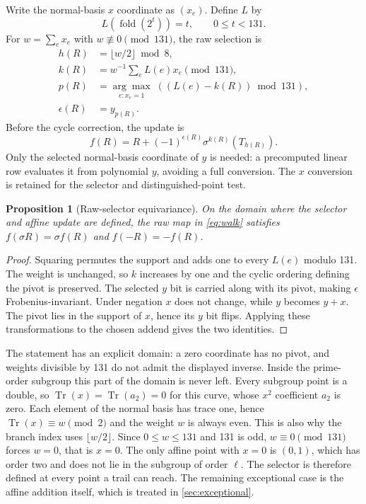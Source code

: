 \documentclass[11pt,a4paper]{article}
\newtheorem{proposition}{Proposition}
\begin{document}
Write the normal-basis $x$ coordinate as $(x_e)$. Define $L$ by
\begin{equation}
 L(\operatorname{fold}(2^t))=t,\qquad 0\leq t<131.
\end{equation}
For $w=\sum_e x_e$ with $w\not\equiv0\pmod{131}$, the raw selection is
\begin{align}
 h(R)&=\lfloor w/2\rfloor\bmod8,\\
 k(R)&=w^{-1}\sum_e L(e)x_e\pmod{131},\\
 p(R)&=\underset{e:x_e=1}{\arg\max}\;((L(e)-k(R))\bmod131),\\
 \epsilon(R)&=y_{p(R)}.
\end{align}
Before the cycle correction, the update is
\begin{equation}\label{eq:walk}
 f(R)=R+(-1)^{\epsilon(R)}\sigma^{k(R)}(T_{h(R)}).
\end{equation}
Only the selected normal-basis coordinate of $y$ is needed: a precomputed linear row evaluates it from polynomial $y$, avoiding a full conversion. The $x$ conversion is retained for the selector and distinguished-point test.

\begin{proposition}[Raw-selector equivariance]
On the domain where the selector and affine update are defined, the raw map in \cref{eq:walk} satisfies $f(\sigma R)=\sigma f(R)$ and $f(-R)=-f(R)$.
\end{proposition}
\begin{proof}
Squaring permutes the support and adds one to every $L(e)$ modulo 131. The weight is unchanged, so $k$ increases by one and the cyclic ordering defining the pivot is preserved. The selected $y$ bit is carried along with its pivot, making $\epsilon$ Frobenius-invariant. Under negation $x$ does not change, while $y$ becomes $y+x$. The pivot lies in the support of $x$, hence its $y$ bit flips. Applying these transformations to the chosen addend gives the two identities.
\end{proof}

The statement has an explicit domain: a zero coordinate has no pivot, and weights divisible by 131 do not admit the displayed inverse. Inside the prime-order subgroup this part of the domain is never left. Every subgroup point is a double, so $\operatorname{Tr}(x)=\operatorname{Tr}(a_2)=0$ for this curve, whose $x^2$ coefficient $a_2$ is zero. Each element of the normal basis has trace one, hence $\operatorname{Tr}(x)\equiv w\pmod2$ and the weight $w$ is always even. This is also why the branch index uses $\lfloor w/2\rfloor$. Since $0\leq w\leq131$ and 131 is odd, $w\equiv0\pmod{131}$ forces $w=0$, that is $x=0$. The only affine point with $x=0$ is $(0,1)$, which has order two and does not lie in the subgroup of order $\ell$. The selector is therefore defined at every point a trail can reach. The remaining exceptional case is the affine addition itself, which is treated in \cref{sec:exceptional}.
\end{document}
